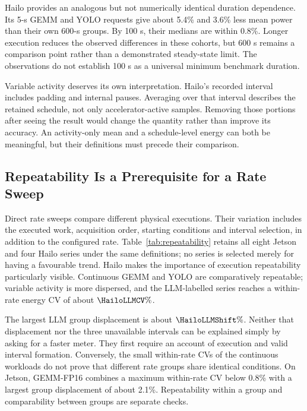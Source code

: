 Hailo provides an analogous but not numerically identical duration dependence. Its 5-s GEMM and YOLO requests give about 5.4\% and 3.6\% less mean power than their own 600-s groups. By 100 s, their medians are within 0.8\%. Longer execution reduces the observed differences in these cohorts, but 600 s remains a comparison point rather than a demonstrated steady-state limit. The observations do not establish 100 s as a universal minimum benchmark duration.

Variable activity deserves its own interpretation. Hailo's recorded interval includes padding and internal pauses. Averaging over that interval describes the retained schedule, not only accelerator-active samples. Removing those portions after seeing the result would change the quantity rather than improve its accuracy. An activity-only mean and a schedule-level energy can both be meaningful, but their definitions must precede their comparison.

\subsection{Repeatability Is a Prerequisite for a Rate Sweep}
Direct rate sweeps compare different physical executions. Their variation includes the executed work, acquisition order, starting conditions and interval selection, in addition to the configured rate. Table~\ref{tab:repeatability} retains all eight Jetson and four Hailo series under the same definitions; no series is selected merely for having a favourable trend. Hailo makes the importance of execution repeatability particularly visible. Continuous GEMM and YOLO are comparatively repeatable; variable activity is more dispersed, and the LLM-labelled series reaches a within-rate energy CV of about $\HailoLLMCV\%$.

\begin{table}[t]
\caption{Direct Jetson and Hailo sweeps. Each series has 27 rate groups except Jetson YOLO-FP32, which has 26. ``Max. shift'' compares a rate-group energy mean with the equally weighted mean of rate-group means. All finite results are retained; three LLM intervals are missing. These are between-execution statistics, not same-trace sampling errors.}
\label{tab:repeatability}
\centering\footnotesize
\end{table}

The largest LLM group displacement is about $\HailoLLMShift\%$. Neither that displacement nor the three unavailable intervals can be explained simply by asking for a faster meter. They first require an account of execution and valid interval formation. Conversely, the small within-rate CVs of the continuous workloads do not prove that different rate groups share identical conditions. On Jetson, GEMM-FP16 combines a maximum within-rate CV below 0.8\% with a largest group displacement of about 2.1\%. Repeatability within a group and comparability between groups are separate checks.

